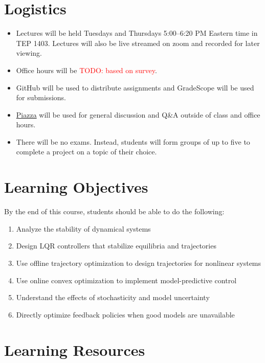 \documentclass[11pt,letterpaper]{article}
\newcommand{\todo}[1]{\textcolor{red}{TODO: #1}}
\begin{document}
\section*{Logistics}

\begin{itemize}
	\item Lectures will be held Tuesdays and Thursdays 5:00--6:20 PM Eastern time in TEP 1403. Lectures will also be live streamed on zoom and recorded for later viewing.
	\item Office hours will be \todo{based on survey}.
	\item GitHub will be used to distribute assignments and GradeScope will be used for submissions.
	\item \href{https://piazza.com/cmu/spring2024/16745/home}{Piazza} will be used for general discussion and Q\&A outside of class and office hours.
	\item There will be no exams. Instead, students will form groups of up to five to complete a project on a topic of their choice.
\end{itemize}

\newpage 
\section*{Learning Objectives}
By the end of this course, students should be able to do the following:
\begin{enumerate}
	\item Analyze the stability of dynamical systems
	\item Design LQR controllers that stabilize equilibria and trajectories
	\item Use offline trajectory optimization to design trajectories for nonlinear systems
	\item Use online convex optimization to implement model-predictive control
	\item Understand the effects of stochasticity and model uncertainty
	\item Directly optimize feedback policies when good models are unavailable
\end{enumerate}

\section*{Learning Resources}
\end{document}
